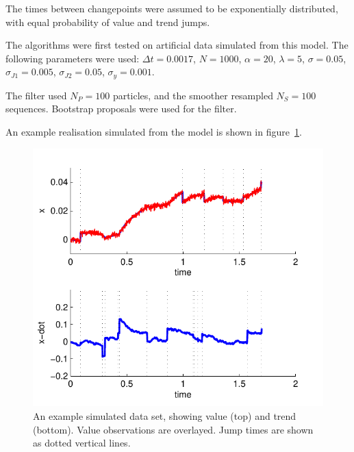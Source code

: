 \documentclass[journal]{IEEEtran}
\begin{document}
The times between changepoints were assumed to be exponentially distributed, with equal probability of value and trend jumps.
%

The algorithms were first tested on artificial data simulated from this model. The following parameters were used: $\Delta t = 0.0017$, $N = 1000$, $\alpha = 20$, $\lambda = 5$, $\sigma = 0.05$, $\sigma_{J1} = 0.005$, $\sigma_{J2} = 0.05$, $\sigma_{y} = 0.001$.

The filter used $N_P = 100$ particles, and the smoother resampled $N_S = 100$ sequences. Bootstrap proposals were used for the filter.

An example realisation simulated from the model is shown in figure~\ref{fig:example_data}.

\begin{figure}[!t]
\centering
\includegraphics[width=0.9\columnwidth]{example_data.pdf}
\caption{An example simulated data set, showing value (top) and trend (bottom). Value observations are overlayed. Jump times are shown as dotted vertical lines.}
\label{fig:example_data}
\end{figure}
\end{document}

